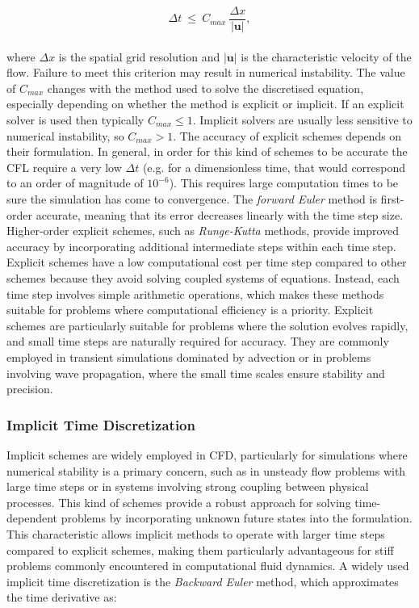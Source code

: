 \documentclass[a5paper]{sapthesis}
\begin{document}
	\begin{equation}
	\Delta t \ \leq \ C_{max} \ \dfrac{\Delta x}{|\mathbf{u}|},
	\label{CFL}
	\end{equation}
	\\
	where $\Delta x$ is the spatial grid resolution and $|\mathbf{u}|$ is the characteristic velocity of the flow. Failure to meet this criterion may result in numerical instability. The value of $C_{max}$ changes with the method used to solve the discretised equation, especially depending on whether the method is explicit or implicit. If an explicit solver is used then typically $C_{max} \leq 1$. Implicit solvers are usually less sensitive to numerical instability, so $C_{max} > 1$. 
    The accuracy of explicit schemes depends on their formulation.
	In general, in order for this kind of schemes to be accurate the CFL require a very low $\Delta t$ (e.g. for a dimensionless time, that would correspond to an order of magnitude of $10^{-6}$). This requires large computation times to be sure the simulation has come to convergence.
	The \textit{forward Euler} method is first-order accurate, meaning that its error decreases linearly with the time step size. Higher-order explicit schemes, such as \textit{Runge-Kutta} methods, provide improved accuracy by incorporating additional intermediate steps within each time step.
	Explicit schemes have a low computational cost per time step compared to other schemes because they avoid solving coupled systems of equations. Instead, each time step involves simple arithmetic operations, which makes these methods suitable for problems where computational efficiency is a priority.
	Explicit schemes are particularly suitable for problems where the solution evolves rapidly, and small time steps are naturally required for accuracy. They are commonly employed in transient simulations dominated by advection or in problems involving wave propagation, where the small time scales ensure stability and precision.
	
	\subsubsection{Implicit Time Discretization}
	
	Implicit schemes are widely employed in CFD, particularly for simulations where numerical stability is a primary concern, such as in unsteady flow problems with large time steps or in systems involving strong coupling between physical processes.
	This kind of schemes provide a robust approach for solving time-dependent problems by incorporating unknown future states into the formulation. This characteristic allows implicit methods to operate with larger time steps compared to explicit schemes, making them particularly advantageous for stiff problems commonly encountered in computational fluid dynamics. A widely used implicit time discretization is the \textit{Backward Euler}\cite{darwish2016finite} method, which approximates the time derivative as:
	
\end{document}
